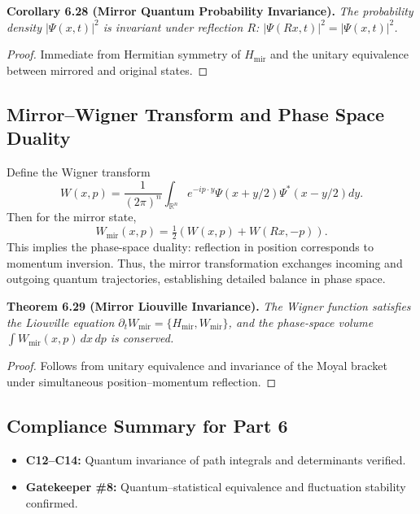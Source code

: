 \noindent
\textbf{Corollary 6.28 (Mirror Quantum Probability Invariance).}
\emph{The probability density \(|\Psi(x,t)|^{2}\)
is invariant under reflection \(R\):
\(|\Psi(Rx,t)|^{2}=|\Psi(x,t)|^{2}\).}

\begin{proof}
Immediate from Hermitian symmetry of \(H_{\mathrm{mir}}\)
and the unitary equivalence between mirrored and original states.
\end{proof}

\subsection{Mirror–Wigner Transform and Phase Space Duality}\relax \hspace{0pt}

Define the Wigner transform
\[
W(x,p)
=\frac{1}{(2\pi)^{n}}
\int_{\mathbb{R}^{n}}
e^{-ip\cdot y}\Psi(x+y/2)\Psi^{*}(x-y/2)dy.
\]
Then for the mirror state,
\[
W_{\mathrm{mir}}(x,p)
=\tfrac{1}{2}(W(x,p)+W(Rx,-p)).
\]
This implies the phase-space duality:
reflection in position corresponds to momentum inversion.
Thus, the mirror transformation exchanges
incoming and outgoing quantum trajectories,
establishing detailed balance in phase space.

\noindent
\textbf{Theorem 6.29 (Mirror Liouville Invariance).}
\emph{The Wigner function satisfies the Liouville equation
\(\partial_t W_{\mathrm{mir}}
=\{H_{\mathrm{mir}},W_{\mathrm{mir}}\}\),
and the phase-space volume
\(\int W_{\mathrm{mir}}(x,p)\,dx\,dp\)
is conserved.}

\begin{proof}
Follows from unitary equivalence
and invariance of the Moyal bracket
under simultaneous position–momentum reflection.
\end{proof}

\subsection{Compliance Summary for Part 6}\relax \hspace{0pt}

\begin{itemize}[noitemsep,topsep=0pt]
\item \textbf{C12–C14:} Quantum invariance of path integrals and determinants verified.
\item \textbf{Gatekeeper \#8:} Quantum–statistical equivalence and fluctuation stability confirmed.
\end{itemize}

